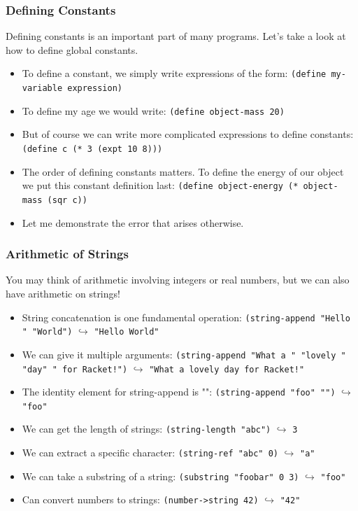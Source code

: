 \documentclass{beamer}
\begin{document}
\begin{frame}
  \frametitle{Defining Constants}
  Defining constants is an important part of many programs. Let's take
  a look at how to define global constants.
  \begin{itemize}
  \item<2-> To define a constant, we simply write expressions of the form:
    \texttt{(define my-variable expression)} 
  \item<3-> To define my age we would write:
    \texttt{(define object-mass 20)}
  \item<4-> But of course we can write more complicated expressions
    to define constants: \texttt{(define c (* 3 (expt 10 8)))}
  \item<5-> The order of defining constants matters. To define the energy of
    our object we put this constant definition last:
    \texttt{(define object-energy (* object-mass (sqr c))}
  \item<6-> Let me demonstrate the error that arises otherwise.
  \end{itemize}
\end{frame}

\begin{frame}
  \frametitle{Arithmetic of Strings}
  You may think of arithmetic involving integers or real numbers, but
  we can also have arithmetic on strings!
  \begin{itemize}
  \item<2-> String concatenation is one fundamental operation: \texttt{(string-append "Hello " "World")} $\hookrightarrow$
    \texttt{"Hello World"}
  \item<3-> We can give it multiple arguments: \texttt{(string-append "What a " "lovely " "day" " for Racket!")} $\hookrightarrow$ \texttt{"What a lovely day for Racket!"}
  \item<4-> The identity element for string-append is "":
    \texttt{(string-append "foo" "")} $\hookrightarrow$
    \texttt{"foo"}
  \item<5-> We can get the length of strings: \texttt{(string-length "abc")} $\hookrightarrow$ \texttt{3}
  \item<6-> We can extract a specific character: \texttt{(string-ref "abc" 0)} $\hookrightarrow$ \texttt{"a"}
  \item<7-> We can take a substring of a string: \texttt{(substring "foobar" 0 3)} $\hookrightarrow$ \texttt{"foo"}
  \item<8-> Can convert numbers to strings: \texttt{(number->string 42)} $\hookrightarrow$ \texttt{"42"}
  \end{itemize}
\end{frame}
\end{document}
